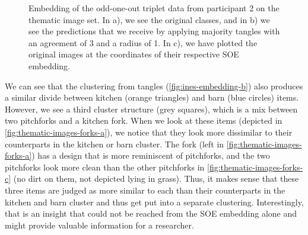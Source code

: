 \onecolumn
\begin{figure}[ht]
    \centering
    \hfill
    \caption{
        Embedding of the odd-one-out triplet data from participant 2 on the thematic image set.
        In a), we see the original classes, and in b) we see the predictions that we receive by
        applying majority tangles with an agreement of 3 and a radius of 1.
        In c), we have plotted the original images at the coordinates of their respective SOE embedding.
    }
    \label{fig:ines-embedding}
\end{figure}

We can see that the clustering from tangles (\autoref{fig:ines-embedding-b}) also produces a similar divide between kitchen (orange triangles) and barn (blue circles) items. 
However, we see a third cluster structure (grey squares), which is a mix between two pitchforks and a kitchen fork. 
When we look at these items (depicted in \autoref{fig:thematic-images-forks-a}), we notice that they look more dissimilar to their
counterparts in the kitchen or barn cluster. The fork (left in \autoref{fig:thematic-images-forks-a}) has a design that is more reminiscent of pitchforks, and the two pitchforks
look more clean than the other pitchforks in \autoref{fig:thematic-images-forks-c} (no dirt on them, not depicted lying in grass). Thus, it makes sense that these three items are judged
as more similar to each than their counterparts in the kitchen and barn cluster and thus get put into a separate clustering. Interestingly, that is an insight that could not be reached from the 
SOE embedding alone and might provide valuable information for a researcher.

